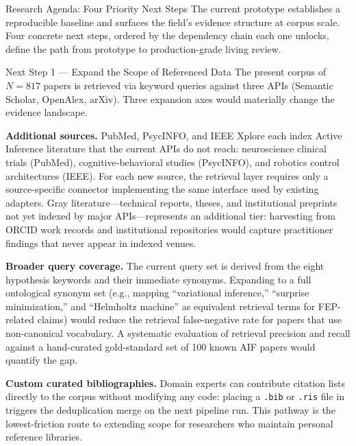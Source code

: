 \documentclass[
  ignorenonframetext,
]{beamer}
\begin{document}
\begin{frame}{Research Agenda: Four Priority
Next Steps \label{sec:next_steps}}
\protect{}\label{research-agenda-four-priority-next-steps}
The current prototype establishes a reproducible baseline and surfaces
the field's evidence structure at corpus scale. Four concrete next
steps, ordered by the dependency chain each one unlocks, define the path
from prototype to production-grade living review.

\begin{block}{Next Step 1 --- Expand the Scope of Referenced Data}
\protect{}\label{next-step-1-expand-the-scope-of-referenced-data}
The present corpus of \(N = 817\) papers is retrieved via keyword
queries against three APIs (Semantic Scholar, OpenAlex, arXiv). Three
expansion axes would materially change the evidence landscape.

\textbf{Additional sources.} PubMed, PsycINFO, and IEEE Xplore each
index Active Inference literature that the current APIs do not reach:
neuroscience clinical trials (PubMed), cognitive-behavioral studies
(PsycINFO), and robotics control architectures (IEEE). For each new
source, the retrieval layer requires only a source-specific connector
implementing the same 
interface used by existing adapters. Gray literature---technical
reports, theses, and institutional preprints not yet indexed by major
APIs---represents an additional tier: harvesting from ORCID work records
and institutional repositories would capture practitioner findings that
never appear in indexed venues.

\textbf{Broader query coverage.} The current query set is derived from
the eight hypothesis keywords and their immediate synonyms. Expanding to
a full ontological synonym set (e.g., mapping ``variational inference,''
``surprise minimization,'' and ``Helmholtz machine'' as equivalent
retrieval terms for FEP-related claims) would reduce the retrieval
false-negative rate for papers that use non-canonical vocabulary. A
systematic evaluation of retrieval precision and recall against a
hand-curated gold-standard set of 100 known AIF papers would quantify
the gap.

\textbf{Custom curated bibliographies.} Domain experts can contribute
citation lists directly to the corpus without modifying any code:
placing a \texttt{.bib} or \texttt{.ris} file in
 triggers the deduplication merge
on the next pipeline run. This pathway is the lowest-friction route to
extending scope for researchers who maintain personal reference
libraries.
\end{block}


\end{frame}
\end{document}
